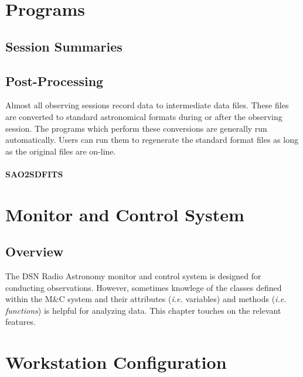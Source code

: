 \documentclass[letterpaper,11pt]{book}
\begin{document}
\chapter{Programs}\label{chap:programs}

\section{Session Summaries}



\section{Post-Processing}

Almost all observing sessions record data to intermediate data files.  These
files are converted to standard astronomical formats during or after the
observing session. The programs which perform these conversions are generally
run automatically.  Users can run them to regenerate the standard format files
as long as the original files are on-line.

\subsubsection{\ttfamily SAO2SDFITS}



\chapter{Monitor and Control System}\label{chap:MandC}

\section{Overview}

The DSN Radio Astronomy monitor and control system is designed for conducting
observations.  However, sometimes knowlege of the classes defined within the
M\&C system and their attributes ({\itshape i.e.} variables) and methods
({\itshape i.e. functions}) is helpful for analyzing data. This chapter touches
on the relevant features.

\appendix


\chapter{Workstation Configuration}\label{app:ws-configure}
\end{document}
